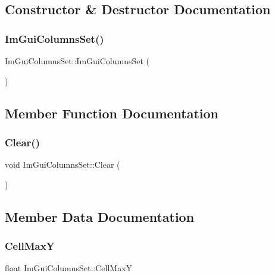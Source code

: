 \subsection{Constructor \& Destructor Documentation}
\hypertarget{struct_im_gui_columns_set_a151a94550f1575639b6f8be0d63b7caa}{}\label{struct_im_gui_columns_set_a151a94550f1575639b6f8be0d63b7caa} 
\subsubsection{\texorpdfstring{Im\+Gui\+Columns\+Set()}{ImGuiColumnsSet()}}
{\footnotesize\ttfamily Im\+Gui\+Columns\+Set\+::\+Im\+Gui\+Columns\+Set (\begin{DoxyParamCaption}{ }\end{DoxyParamCaption})}



\subsection{Member Function Documentation}
\hypertarget{struct_im_gui_columns_set_acbaeb17ee3c2026ff36ecba69906eb6c}{}\label{struct_im_gui_columns_set_acbaeb17ee3c2026ff36ecba69906eb6c} 
\subsubsection{\texorpdfstring{Clear()}{Clear()}}
{\footnotesize\ttfamily void Im\+Gui\+Columns\+Set\+::\+Clear (\begin{DoxyParamCaption}{ }\end{DoxyParamCaption})}



\subsection{Member Data Documentation}
\hypertarget{struct_im_gui_columns_set_a6468f959f84876da6fee25698b796f04}{}\label{struct_im_gui_columns_set_a6468f959f84876da6fee25698b796f04} 
\subsubsection{\texorpdfstring{Cell\+MaxY}{CellMaxY}}
{\footnotesize\ttfamily float Im\+Gui\+Columns\+Set\+::\+Cell\+MaxY}

